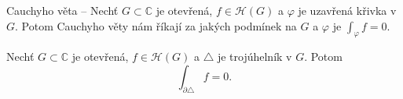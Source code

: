 \begin{note}
Cauchyho věta -- Nechť $G \subset \mathbb{C}$ je otevřená, $f \in \mathcal{H}(G)$ a $\varphi$ je uzavřená křivka v $G$. Potom Cauchyho věty nám říkají za jakých podmínek na $G$ a $\varphi$ je $\int_\varphi f=0$.
\end{note}%

\begin{theorem}\label{thm:goursat}
Nechť $G \subset \mathbb{C}$ je otevřená, $f \in \mathcal{H}(G)$ a $\triangle$ je trojúhelník v $G$. Potom
\begin{equation}
    \int_{\partial\triangle}f=0\text{.}
\end{equation} 
\end{theorem}

